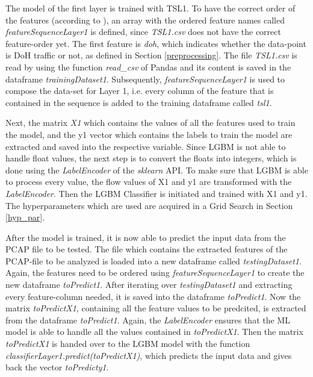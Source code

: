 The model of the first layer is trained with TSL1. To have the correct order of the features (according to \cite{BehnkeEtAl_FeatureEngineeringMLModelMaliciusDoHTraffic}), an array with the ordered feature names called \textit{featureSequenceLayer1} is defined, since \textit{TSL1.csv} does not have the correct feature-order yet. The first feature is \textit{doh}, which indicates whether the data-point is DoH traffic or not, as defined in Section \ref{preprocessing}. The file \textit{TSL1.csv} is read by using the function \textit{read\_csv} of Pandas and its content is saved in the dataframe \textit{trainingDataset1}. Subsequently, \textit{featureSequenceLayer1} is used to compose the data-set for Layer 1, i.e. every column of the feature that is contained in the sequence is added to the training dataframe called \textit{tsl1}.

Next, the matrix \textit{X1} which contains the values of all the features used to train the model, and the y1 vector which contains the labels to train the model are extracted and saved into the respective variable. Since LGBM is not able to handle float values, the next step is to convert the floats into integers, which is done using the \textit{LabelEncoder} of the \textit{sklearn} API. To make sure that LGBM is able to process every value, the flow values of X1 and y1 are transformed with the \textit{LabelEncoder}. Then the LGBM Classifier is initiated and trained with X1 and y1. The hyperparameters which are used are acquired in a Grid Search in Section \ref{hyp_par}. 

After the  model is trained, it is now able to predict the input data from the PCAP file to be tested. The file which contains the extracted features of the PCAP-file to be analyzed is loaded into a new dataframe called \textit{testingDataset1}. Again, the features need to be ordered using \textit{featureSequenceLayer1} to create the new dataframe \textit{toPredict1}. After iterating over \textit{testingDataset1} and extracting every feature-column needed, it is saved into the dataframe \textit{toPredict1}. Now the matrix \textit{toPredictX1}, containing all the feature values to be predcited, is extracted from the dataframe \textit{toPredict1}. Again, the \textit{LabelEncoder} ensures that the ML model is able to handle all the values contained in \textit{toPredictX1}. Then the matrix \textit{toPredictX1} is handed over to the LGBM model with the function \textit{classifierLayer1.predict(toPredictX1)}, which predicts the input data and gives back the vector \textit{toPredicty1}.

